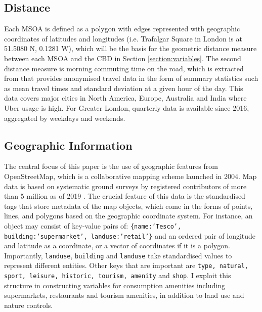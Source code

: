 \documentclass{article}
\begin{document}
\subsection{Distance}
Each MSOA is defined as a polygon with edges represented with geographic coordinates of latitudes and longitudes (i.e. Trafalgar Square in London is at 51.5080 N, 0.1281 W), which will be the basis for the geometric distance measure between each MSOA and the CBD in Section \ref{section:variables}. The second distance measure is morning commuting time on the road, which is extracted from \citet{UberMovement2019MovementCities} that provides anonymised travel data in the form of summary statistics such as mean travel times and standard deviation at a given hour of the day. This data covers major cities in North America, Europe, Australia and India where Uber usage is high. For Greater London, quarterly data is available since 2016, aggregated by weekdays and weekends.

\subsection{Geographic Information}
The central focus of this paper is the use of geographic features from OpenStreetMap, which is a collaborative mapping scheme launched in 2004. Map data is based on systematic ground surveys by registered contributors of more than 5 million as of 2019 \citep{OpenStreetMap2019Contributors}. The crucial feature of this data is the standardised tags that store metadata of the map objects, which come in the forms of points, lines, and polygons based on the geographic coordinate system. For instance, an object may consist of key-value pairs of:  \texttt{\{name:'Tesco', building:'supermarket', landuse:'retail'\}} and an ordered pair of longitude and latitude as a coordinate, or a vector of coordinates if it is a polygon. Importantly, \texttt{landuse}, \texttt{building} and \texttt{landuse} take standardised values to represent different entities. Other keys that are important are \texttt{type, natural, sport, leisure, historic, tourism, amenity} and \texttt{shop}. I exploit this structure in constructing variables for consumption amenities including supermarkets, restaurants and tourism amenities, in addition to land use and nature controls.
\end{document}
